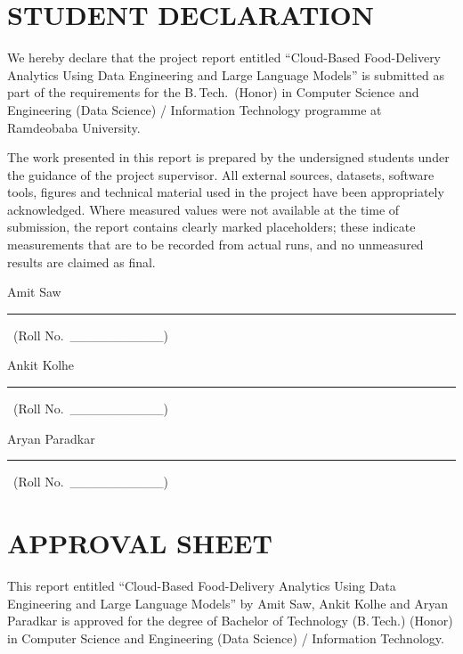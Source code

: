 \documentclass[12pt,a4paper]{report}
\begin{document}
\chapter*{STUDENT DECLARATION}

\noindent We hereby declare that the project report entitled ``Cloud-Based Food-Delivery Analytics Using Data Engineering and Large Language Models'' is submitted as part of the requirements for the B.\,Tech.\ (Honor) in Computer Science and Engineering (Data Science) / Information Technology programme at Ramdeobaba University.

The work presented in this report is prepared by the undersigned students under the guidance of the project supervisor. All external sources, datasets, software tools, figures and technical material used in the project have been appropriately acknowledged. Where measured values were not available at the time of submission, the report contains clearly marked placeholders; these indicate measurements that are to be recorded from actual runs, and no unmeasured results are claimed as final.

\vspace{1.5cm}
\noindent Amit Saw \ \rule{5cm}{0.4pt} \ (Roll No.\ \_\_\_\_\_\_\_\_\_\_)

\vspace{0.6cm}
\noindent Ankit Kolhe \ \rule{5cm}{0.4pt} \ (Roll No.\ \_\_\_\_\_\_\_\_\_\_)

\vspace{0.6cm}
\noindent Aryan Paradkar \ \rule{5cm}{0.4pt} \ (Roll No.\ \_\_\_\_\_\_\_\_\_\_)

\chapter*{APPROVAL SHEET}

\noindent This report entitled ``Cloud-Based Food-Delivery Analytics Using Data Engineering and Large Language Models'' by Amit Saw, Ankit Kolhe and Aryan Paradkar is approved for the degree of Bachelor of Technology (B.\,Tech.) (Honor) in Computer Science and Engineering (Data Science) / Information Technology.
\end{document}
